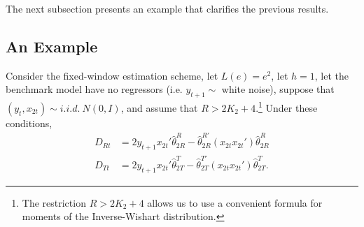 \documentclass[11pt]{article}
\begin{document}
The next subsection presents an example that clarifies the previous
results.

\subsection{An Example}\label{sec:example}

Consider the fixed-window estimation scheme, let $L(e) = e^2$, let $h
= 1$, let the benchmark model have no regressors (i.e. $y_{t+1} \sim$
white noise), suppose that $(y_{t}, x_{2t}) \sim i.i.d.\ N(0,I)$, and
assume that $R > 2K_2 + 4$.\footnote{The restriction $R > 2 K_2 + 4$
  allows us to use a convenient formula for moments of the
  Inverse-Wishart distribution.}  Under these conditions,
\begin{align*}
  D_{Rt} &= 2 y_{t+1} x_{2t}'\hat{\theta}_{2R}^R -
  \hat{\theta}_{2R}^{R\prime} (x_{2t} x_{2t}') \hat{\theta}_{2R}^R \\
  D_{Tt} &= 2 y_{t+1} x_{2t}'\hat{\theta}_{2T}^T -
  \hat{\theta}_{2T}^{T\prime} (x_{2t} x_{2t}') \hat{\theta}_{2T}^T.
\end{align*}
\end{document}

